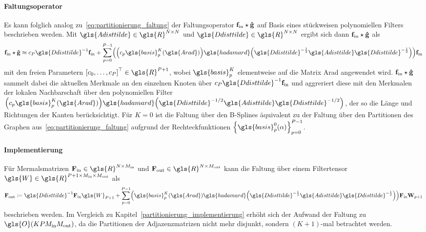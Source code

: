 \paragraph{Faltungsoperator}
\label{bspline_faltungsoperator}

Es kann folglich analog zu~\eqref{eq:partitionierung_faltung} der Faltungsoperator $\mathbf{f}_{\mathrm{in}} \star \mathbf{\hat g}$ auf Basis eines stückweisen polynomiellen Filters beschrieben werden.
Mit $\gls{Adisttilde} \in \gls{R}^{N \times N}$ und $\gls{Ddisttilde} \in \gls{R}^{N \times N}$ ergibt sich dann $\mathbf{f}_{\mathrm{in}} \star \mathbf{\hat g}$ als
\begin{equation*}
  \ve{f}_{\mathrm{in}} \star \ve{\hat g} \approx c_P \gls{Ddisttilde}^{-1}\ve{f}_{\mathrm{in}} + \sum_{p=0}^{P-1} \left(\left(c_p \gls{basis}_p^K\left(\gls{Arad}\right)\right)\gls{hadamard}\left(\gls{Ddisttilde}^{-\frac{1}{2}}\gls{Adisttilde}\gls{Ddisttilde}^{-\frac{1}{2}}\right)\right)\ve{f}_{\mathrm{in}}
\end{equation*}
mit den freien Parametern ${\left[c_0, \ldots, c_P\right]}^{\top} \in \gls{R}^{P+1}$, wobei $\gls{basis}_p^K$ elementweise auf die Matrix \gls{Arad} angewendet wird.
$\mathbf{f}_{\mathrm{in}} \star \mathbf{\hat g}$ sammelt dabei die aktuellen Merkmale an den einzelnen Knoten über $c_P \gls{Ddisttilde}^{-1}\ve{f}_{\mathrm{in}}$ und aggreriert diese mit den Merkmalen der lokalen Nachbarschaft über den polynomiellen Filter $\left(c_p\gls{basis}_p^K \left(\gls{Arad}\right)\right) \gls{hadamard} \left(\gls{Ddisttilde}^{-1/2}\gls{Adisttilde}\gls{Ddisttilde}^{-1/2}\right)$, der so die Länge und Richtungen der Kanten berücksichtigt.
Für $K=0$ ist die Faltung über den B-Splines äquivalent zu der Faltung über den Partitionen des Graphen aus~\eqref{eq:partitionierung_faltung} aufgrund der Rechteckfunktionen ${\left\{\gls{basis}_p^0\left(\alpha\right)\right\}}_{p=0}^{P-1}$.

\paragraph{Implementierung}
\label{bspline_implementierung}

Für Mermalsmatrizen $\ma{F}_{\mathrm{in}} \in \gls{R}^{N \times M_{\mathrm{in}}}$ und $\ma{F}_{\mathrm{out}} \in \gls{R}^{N \times M_{\mathrm{out}}}$ kann die Faltung über einem Filtertensor $\gls{W} \in \gls{R}^{P+1 \times M_{\mathrm{in}} \times M_{\mathrm{out}}}$ als
\begin{equation*}
  \ma{F}_{\mathrm{out}} \coloneqq \gls{Ddisttilde}^{-1}\ma{F}_{\mathrm{in}}\gls{W}_{P+1} + \sum_{p=0}^{P-1} \left(\gls{basis}_p^K\left(\gls{Arad}\right) \gls{hadamard}\left(\gls{Ddisttilde}^{-\frac{1}{2}}\gls{Adisttilde}\gls{Ddisttilde}^{-\frac{1}{2}}\right)\right)\ma{F}_{\mathrm{in}}\ma{W}_{p+1}
\end{equation*}
beschrieben werden.
Im Vergleich zu Kapitel~\eqref{partitionierung_implementierung} erhöht sich der Aufwand der Faltung zu $\gls{O}\left(KPM_{\mathrm{in}}M_{\mathrm{out}}\right)$, da die Partitionen der Adjazenzmatrizen nicht mehr disjunkt, sondern $\left(K+1\right)$-mal betrachtet werden.

